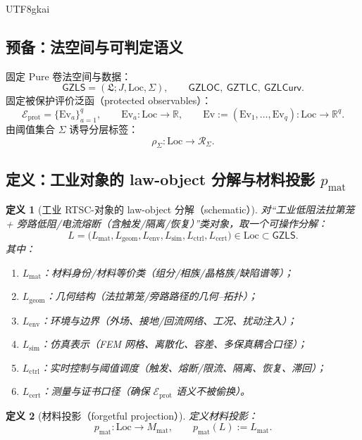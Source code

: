 \documentclass[12pt]{article}
\newtheorem{definition}{定义}[section]
\newcommand{\GZLS}{\ensuremath{\mathsf{GZLS}}}
\newcommand{\GZLOC}{\ensuremath{\mathsf{GZLOC}}}
\newcommand{\GZLCurv}{\ensuremath{\mathsf{GZLCurv}}}
\newcommand{\GZTLC}{\ensuremath{\mathsf{GZTLC}}}
\newcommand{\RTSC}{\textsf{RTSC}}
\begin{document}
\begin{CJK*}{UTF8}{gkai}
\subsection{预备：法空间与可判定语义}

固定 Pure 卷法空间与数据：
\[
\GZLS=(\mathfrak{L};J,\mathrm{Loc},\Sigma),\qquad \GZLOC,\ \GZTLC,\ \GZLCurv.
\]
固定被保护评价泛函（protected observables）：
\[
\mathcal{E}_{\mathrm{prot}}=\{\mathrm{Ev}_a\}_{a=1}^{q},\qquad \mathrm{Ev}_a:\mathrm{Loc}\to\mathbb{R},
\qquad
\mathrm{Ev}:=(\mathrm{Ev}_1,\dots,\mathrm{Ev}_q):\mathrm{Loc}\to\mathbb{R}^q.
\]
由阈值集合 $\Sigma$ 诱导分层标签：
\[
\rho_\Sigma:\mathrm{Loc}\to \mathcal{R}_\Sigma.
\]

\subsection{定义：工业对象的 law-object 分解与材料投影 $p_{\mathrm{mat}}$}

\begin{definition}[工业 \RTSC{}-对象的 law-object 分解（schematic）]
\label{def:markdown-law-object-decomposition}
对“工业低阻法拉第笼 + 旁路低阻/电流熔断（含触发/隔离/恢复）”类对象，取一个可操作分解：
\[
L=\bigl(L_{\mathrm{mat}},L_{\mathrm{geom}},L_{\mathrm{env}},L_{\mathrm{sim}},L_{\mathrm{ctrl}},L_{\mathrm{cert}}\bigr)
  \in \mathrm{Loc}\subset\GZLS.
\]
其中：
\begin{enumerate}
  \item $L_{\mathrm{mat}}$：材料身份/材料等价类（组分/相族/晶格族/缺陷谱等）；
  \item $L_{\mathrm{geom}}$：几何结构（法拉第笼/旁路路径的几何--拓扑）；
  \item $L_{\mathrm{env}}$：环境与边界（外场、接地/回流网络、工况、扰动注入）；
  \item $L_{\mathrm{sim}}$：仿真表示（FEM 网格、离散化、容差、多保真耦合口径）；
  \item $L_{\mathrm{ctrl}}$：实时控制与阈值调度（触发、熔断/限流、隔离、恢复、滞回）；
  \item $L_{\mathrm{cert}}$：测量与证书口径（确保 $\mathcal{E}_{\mathrm{prot}}$ 语义不被偷换）。
\end{enumerate}
\end{definition}

\begin{definition}[材料投影（forgetful projection）]
\label{def:markdown-p-mat}
定义材料投影：
\[
p_{\mathrm{mat}}:\mathrm{Loc}\to M_{\mathrm{mat}},
\qquad
p_{\mathrm{mat}}(L):=L_{\mathrm{mat}}.
\]
\end{definition}


\end{CJK*}
\end{document}
